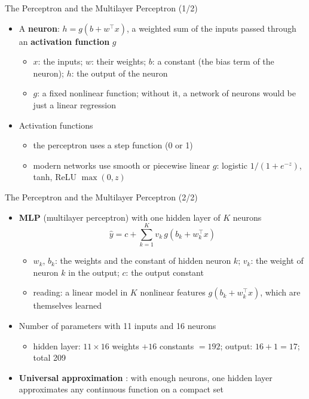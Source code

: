\begin{frame}{The Perceptron and the Multilayer Perceptron (1/2)}
\itemsize{\small}
\begin{itemize}
    \item A \textbf{neuron}: $h = g(b + w^\top x)$, a weighted sum of the inputs passed through an \textbf{activation function} $g$
    \begin{itemize}
        \item $x$: the inputs; $w$: their weights; $b$: a constant (the bias term of the neuron); $h$: the output of the neuron
        \item $g$: a fixed nonlinear function; without it, a network of neurons would be just a linear regression
    \end{itemize}
    \item Activation functions
    \begin{itemize}
        \item the perceptron uses a step function (0 or 1)
        \item modern networks use smooth or piecewise linear $g$: logistic $1/(1 + e^{-z})$, tanh, ReLU $\max(0, z)$
    \end{itemize}
\end{itemize}
\end{frame}

\begin{frame}{The Perceptron and the Multilayer Perceptron (2/2)}
\itemsize{\small}
\begin{itemize}
    \item \textbf{MLP} (multilayer perceptron) with one hidden layer of $K$ neurons \[ \hat y = c + \sum_{k=1}^{K} v_k\, g(b_k + w_k^\top x) \]
    \begin{itemize}
        \item $w_k$, $b_k$: the weights and the constant of hidden neuron $k$; $v_k$: the weight of neuron $k$ in the output; $c$: the output constant
        \item reading: a linear model in $K$ nonlinear features $g(b_k + w_k^\top x)$, which are themselves learned
    \end{itemize}
    \item Number of parameters with 11 inputs and 16 neurons
    \begin{itemize}
        \item hidden layer: $11 \times 16$ weights $+ 16$ constants $= 192$; output: $16 + 1 = 17$; total 209
    \end{itemize}
    \item \textbf{Universal approximation} : with enough neurons, one hidden layer approximates any continuous function on a compact set
\end{itemize}
\end{frame}

